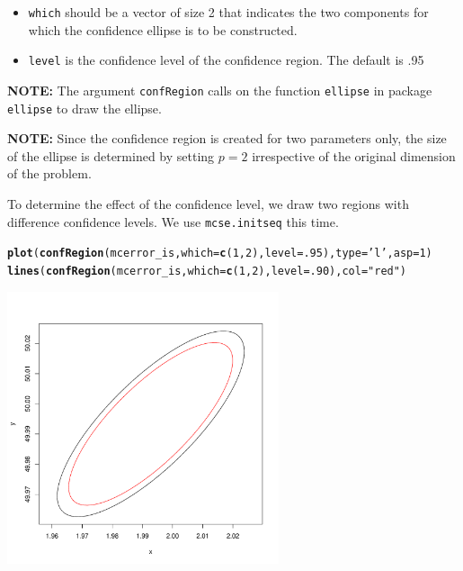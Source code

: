 \documentclass[11pt]{article}\usepackage[]{graphicx}\usepackage[]{color}
\makeatletter
\def\maxwidth{ %
  \ifdim\Gin@nat@width>\linewidth
    \linewidth
  \else
    \Gin@nat@width
  \fi
}
\newcommand{\hlnum}[1]{\textcolor[rgb]{0.686,0.059,0.569}{#1}}%
\newcommand{\hlstr}[1]{\textcolor[rgb]{0.192,0.494,0.8}{#1}}%
\newcommand{\hlstd}[1]{\textcolor[rgb]{0.345,0.345,0.345}{#1}}%
\newcommand{\hlkwc}[1]{\textcolor[rgb]{0.333,0.667,0.333}{#1}}%
\newcommand{\hlkwd}[1]{\textcolor[rgb]{0.737,0.353,0.396}{\textbf{#1}}}%
\newenvironment{kframe}{%
 \def\at@end@of@kframe{}%
 \ifinner\ifhmode%
  \def\at@end@of@kframe{\end{minipage}}%
  \begin{minipage}{\columnwidth}%
 \fi\fi%
 \def\FrameCommand##1{\hskip\@totalleftmargin \hskip-\fboxsep
 \colorbox{shadecolor}{##1}\hskip-\fboxsep
     \hskip-\linewidth \hskip-\@totalleftmargin \hskip\columnwidth}%
 \MakeFramed {\advance\hsize-\width
   \@totalleftmargin\z@ \linewidth\hsize
   \@setminipage}}%
 {\par\unskip\endMakeFramed%
 \at@end@of@kframe}
\newenvironment{knitrout}{}{} %
\makeatother
\begin{document}
\begin{itemize}
\item \texttt{which} should be a vector of size 2 that indicates the two components for which the confidence ellipse is to be constructed.

\item \texttt{level} is the confidence level of the confidence region. The default is .95
\end{itemize}

\bigskip
\textbf{NOTE: }The argument  \texttt{confRegion} calls on the function \texttt{ellipse} in package \texttt{ellipse} to draw the ellipse.

\bigskip
\textbf{NOTE: } Since the confidence region is created for two parameters only, the size of the ellipse is determined by setting $p = 2$ irrespective of the original dimension of the problem.

\bigskip
To determine the effect of the confidence level, we draw two regions with difference confidence levels. We use \texttt{mcse.initseq} this time.

\begin{knitrout}
\color{fgcolor}\begin{kframe}
\begin{alltt}
\hlkwd{plot}\hlstd{(}\hlkwd{confRegion}\hlstd{(mcerror_is,} \hlkwc{which} \hlstd{=} \hlkwd{c}\hlstd{(}\hlnum{1}\hlstd{,}\hlnum{2}\hlstd{),} \hlkwc{level} \hlstd{=} \hlnum{.95}\hlstd{),} \hlkwc{type} \hlstd{=} \hlstr{'l'}\hlstd{,} \hlkwc{asp} \hlstd{=} \hlnum{1}\hlstd{)}
\hlkwd{lines}\hlstd{(}\hlkwd{confRegion}\hlstd{(mcerror_is,} \hlkwc{which} \hlstd{=} \hlkwd{c}\hlstd{(}\hlnum{1}\hlstd{,}\hlnum{2}\hlstd{),} \hlkwc{level} \hlstd{=} \hlnum{.90}\hlstd{),} \hlkwc{col} \hlstd{=} \hlstr{"red"}\hlstd{)}
\end{alltt}
\end{kframe}
\includegraphics[width=\maxwidth,height=8cm]{figure/comp_region-1} 

\end{knitrout}
  
\end{document}
